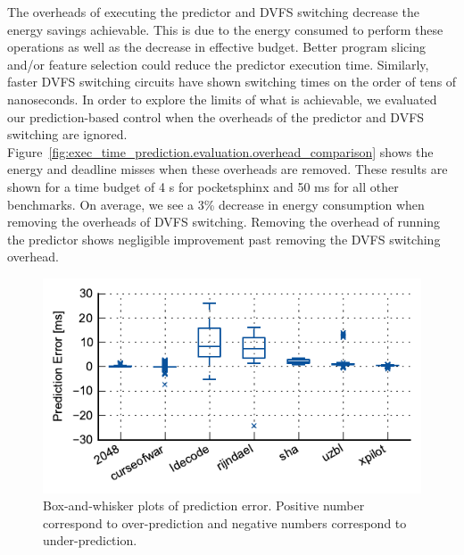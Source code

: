 The overheads of executing the predictor and DVFS switching decrease the energy
savings achievable. This is due to the energy consumed to perform these
operations as well as the decrease in effective budget.  Better program slicing
and/or feature selection could reduce the predictor execution time.  Similarly,
faster DVFS switching circuits \cite{booster-hpca12, shortstop-vlsic13,
fgsync-micro14} have shown switching times on the order of tens of nanoseconds.
In order to explore the limits of what is achievable, we evaluated our
prediction-based control when the overheads of the predictor and DVFS switching
are ignored.
Figure~\ref{fig:exec_time_prediction.evaluation.overhead_comparison} shows the
energy and deadline misses when these overheads are removed. These results are
shown for a time budget of 4 s for pocketsphinx and 50 ms for all other
benchmarks.  On average, we see a 3\% decrease in energy consumption when
removing the overheads of DVFS switching. Removing the overhead of running the
predictor shows negligible improvement past removing the DVFS switching
overhead.

\begin{figure}
  \begin{center}
    \includegraphics{exec_time_prediction/data/prediction_error.pdf}
    \caption{Box-and-whisker plots of prediction error. Positive number
    correspond to over-prediction and negative numbers correspond to
    under-prediction.}
    \label{fig:exec_time_prediction.evaluation.prediction_error}
  \end{center}
\end{figure}

